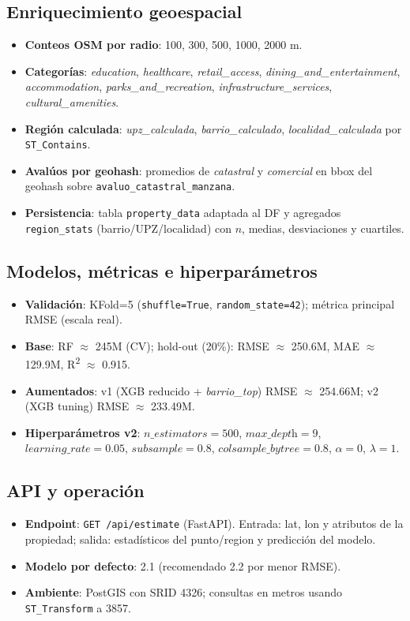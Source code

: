 \subsection{Enriquecimiento geoespacial}
\begin{itemize}
    \item \textbf{Conteos OSM por radio}: 100, 300, 500, 1000, 2000 m.
    \item \textbf{Categorías}: \emph{education}, \emph{healthcare}, \emph{retail\_access}, \emph{dining\_and\_entertainment}, \emph{accommodation}, \emph{parks\_and\_recreation}, \emph{infrastructure\_services}, \emph{cultural\_amenities}.
    \item \textbf{Región calculada}: \emph{upz\_calculada}, \emph{barrio\_calculado}, \emph{localidad\_calculada} por \texttt{ST\_Contains}.
    \item \textbf{Avalúos por geohash}: promedios de \emph{catastral} y \emph{comercial} en bbox del geohash sobre \texttt{avaluo\_catastral\_manzana}.
    \item \textbf{Persistencia}: tabla \texttt{property\_data} adaptada al DF y agregados \texttt{region\_stats} (barrio/UPZ/localidad) con \(n\), medias, desviaciones y cuartiles.
\end{itemize}

\subsection{Modelos, métricas e hiperparámetros}
\begin{itemize}
    \item \textbf{Validación}: KFold=5 (\texttt{shuffle=True}, \texttt{random\_state=42}); métrica principal RMSE (escala real).
    \item \textbf{Base}: RF \(\approx\) 245M (CV); hold-out (20\%): RMSE \(\approx\) 250.6M, MAE \(\approx\) 129.9M, R\textsuperscript{2} \(\approx\) 0.915.
    \item \textbf{Aumentados}: v1 (XGB reducido + \emph{barrio\_top}) RMSE \(\approx\) 254.66M; v2 (XGB tuning) RMSE \(\approx\) 233.49M.
    \item \textbf{Hiperparámetros v2}: \(n\_\textit{estimators}=500\), \(\textit{max\_depth}=9\), \(\textit{learning\_rate}=0.05\), \(\textit{subsample}=0.8\), \(\textit{colsample\_bytree}=0.8\), \(\alpha=0\), \(\lambda=1\).
\end{itemize}

\subsection{API y operación}
\begin{itemize}
    \item \textbf{Endpoint}: \texttt{GET /api/estimate} (FastAPI). Entrada: lat, lon y atributos de la propiedad; salida: estadísticos del punto/region y predicción del modelo.
    \item \textbf{Modelo por defecto}: 2.1 (recomendado 2.2 por menor RMSE).
    \item \textbf{Ambiente}: PostGIS con SRID 4326; consultas en metros usando \texttt{ST\_Transform} a 3857.
\end{itemize}

